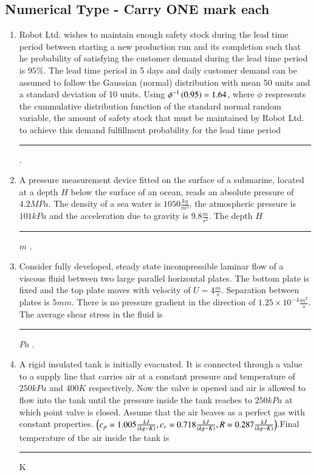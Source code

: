 \documentclass[journal]{IEEEtran}
\numberwithin{equation}{enumi}
\numberwithin{figure}{enumi}
\begin{document}
\subsection{Numerical Type - Carry ONE mark each}
\begin{enumerate}
	\item Robot Ltd. wishes to maintain enough safety stock during the lead time period between starting a new production run and its completion such that he probability of satisfying the customer demand during the lead time period is $95\%$. The lead time period in 5 days and daily customer demand can be assumed to follow the Gaussian (normal) distribution with mean 50 units and a standard deviation of 10 units. Using $\phi^{-1}\left(0.95\right) = 1.64$, where $\phi$ respresents the cummulative distribution function of the standard normal random variable, the amount of safety stock that must be maintained by Robot Ltd. to achieve this demand fulfillment probability for the lead time period \rule{2cm}{0.1pt} .

		\hfill{}

	\item A pressure measurement device fitted on the surface of a submarine, located at a depth $H$ below the surface of an ocean, reads an absolute pressure of $4.2 MPa$. The density of a sea water is $1050\frac{kg}{m^3}$, the atmospheric pressure is $101 kPa$ and the acceleration due to gravity is $9.8\frac{m}{s^2}$. The depth $H$ \rule{1cm}{0.1pt} $m$ .

		\hfill{}

	\item Consider fully developed, steady state incompressible laminar flow of a viscous fluid between two large parallel horizontal plates. The bottom plate is fixed and the top plate moves with velocity of $U = 4 \frac{m}{s}$. Separation between plates is $5 mm$. There is no pressure gradient in the direction of $1.25 \times 10^{-4} \frac{m^2}{s}$. The average shear stress in the fluid is \rule{1cm}{0.1pt} $Pa$ .

		\hfill{}

	\item A rigid insulated tank is initially evacuated. It is connected through a value to a supply line that carries air at a constant pressure and temperature of $250 kPa$ and $400 K$ respectively. Now the valve is opened and air is allowed to flow into the tank until the pressure inside the tank reaches to $250 kPa$ at which point valve is closed. Assume that the air beaves as a perfect gas with constant properties. $\left(c_p = 1.005 \frac{kJ}{\left(kg-K\right)}, c_v = 0.718 \frac{kJ}{\left(kg-K\right)}, R = 0.287 \frac{kJ}{\left(kg-K\right)}\right)$.Final temperature of the air inside the tank is \rule{1cm}{0.1pt} K 


\end{enumerate}
\end{document}
